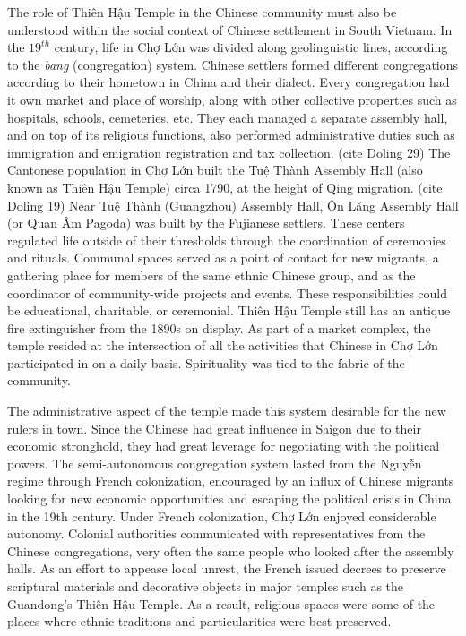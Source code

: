 \vi The role of Thiên Hậu Temple in the Chinese community must also be understood within the social context of Chinese settlement in South Vietnam. In the $19^{th}$ century, life in Chợ Lớn was divided along geolinguistic lines, according to the \textit{bang} (congregation) system. Chinese settlers formed different congregations according to their hometown in China and their dialect. Every congregation had it own market and place of worship, along with other collective properties such as hospitals, schools, cemeteries, etc. They each managed a separate assembly hall, and on top of its religious functions, also performed administrative duties such as immigration and emigration registration and tax collection. (cite Doling 29) The Cantonese population in Chợ Lớn built the Tuệ Thành Assembly Hall (also known as Thiên Hậu Temple) circa 1790, at the height of Qing migration. (cite Doling 19) Near Tuệ Thành (Guangzhou) Assembly Hall, Ôn Lăng Assembly Hall (or Quan Âm Pagoda) was built by the Fujianese settlers. These centers regulated life outside of their thresholds through the coordination of ceremonies and rituals. Communal spaces served as a point of contact for new migrants, a gathering place for members of the same ethnic Chinese group, and as the coordinator of community-wide projects and events. These responsibilities could be educational, charitable, or ceremonial. Thiên Hậu Temple still has an antique fire extinguisher from the 1890s on display. As part of a market complex, the temple resided at the intersection of all the activities that Chinese in Chợ Lớn participated in on a daily basis. Spirituality was tied to the fabric of the community.

The administrative aspect of the temple made this system desirable for the new rulers in town. Since the Chinese had great influence in Saigon due to their economic stronghold, they had great leverage for negotiating with the political powers. The semi-autonomous congregation system lasted from the Nguyễn regime through  French colonization, encouraged by an influx of Chinese migrants looking for new economic opportunities and escaping the political crisis in China in the 19th century. Under French colonization, Chợ Lớn enjoyed considerable autonomy. Colonial authorities communicated with representatives from the Chinese congregations, very often the same people who looked after the assembly halls. As an effort to appease local unrest, the French issued decrees to preserve scriptural materials and decorative objects in major temples such as the Guandong’s Thiên Hậu Temple. As a result, religious spaces were some of the places where ethnic traditions and particularities were best preserved. \en

